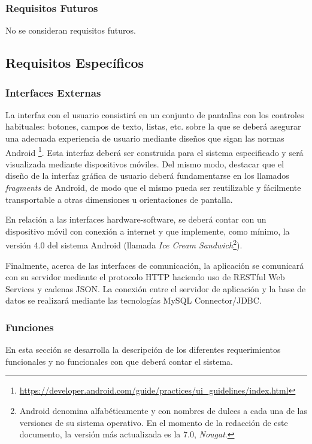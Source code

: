 \subsubsection{Requisitos Futuros}

No se consideran requisitos futuros.

\subsection{Requisitos Específicos}

\subsubsection{Interfaces Externas}

La interfaz con el usuario consistirá en un conjunto de pantallas con los controles habituales: botones, campos de texto, listas, etc. sobre la que se deberá asegurar una adecuada experiencia de usuario mediante diseños que sigan las normas Android \footnote{\url{https://developer.android.com/guide/practices/ui_guidelines/index.html}}. Esta interfaz deberá ser construida para el sistema especificado y será visualizada mediante dispositivos móviles. Del mismo modo, destacar que el diseño de la interfaz gráfica de usuario deberá fundamentarse en los llamados \emph{fragments} de Android, de modo que el mismo pueda ser reutilizable y fácilmente transportable a otras dimensiones u orientaciones de pantalla.

En relación a las interfaces hardware-software, se deberá contar con un dispositivo móvil con conexión a internet y que implemente, como mínimo, la versión 4.0 del sistema Android (llamada \emph{Ice Cream Sandwich}\footnote{Android denomina alfabéticamente y con nombres de dulces a cada una de las versiones de su sistema operativo. En el momento de la redacción de este documento, la versión más actualizada es la 7.0, \textit{Nougat}.}).

Finalmente, acerca de las interfaces de comunicación, la aplicación se comunicará con su servidor mediante el protocolo HTTP haciendo uso de RESTful Web Services y cadenas JSON. La conexión entre el servidor de aplicación y la base de datos se realizará mediante las tecnologías MySQL Connector/JDBC.
\subsubsection{Funciones}

En esta sección se desarrolla la descripción de los diferentes requerimientos funcionales y no funcionales con que deberá contar el sistema. 

